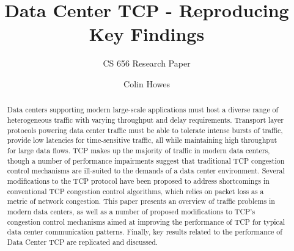 \documentclass[sigconf]{acmart}
\begin{document}
\title{Data Center TCP - Reproducing Key Findings}
\subtitle{CS 656 Research Paper}

\author{Colin Howes}

\begin{abstract}

Data centers supporting modern large-scale applications must host a diverse range of heterogeneous traffic with varying throughput and delay requirements. Transport layer protocols powering data center traffic must be able to tolerate intense bursts of traffic, provide low latencies for time-sensitive traffic, all while maintaining high throughput for large data flows. TCP makes up the majority of traffic in modern data centers, though a number of performance impairments suggest that traditional TCP congestion control mechanisms are ill-suited to the demands of a data center environment. Several modifications to the TCP protocol have been proposed to address shortcomings in conventional TCP congestion control algorithms, which relies on packet loss as a metric of network congestion. This paper presents an overview of traffic problems in modern data centers, as well as a number of proposed modifications to TCP's congestion control mechanisms aimed at improving the performance of TCP for typical data center communication patterns. Finally, key results related to the performance of Data Center TCP are replicated and discussed.

\end{abstract}

\maketitle




 
\end{document}
